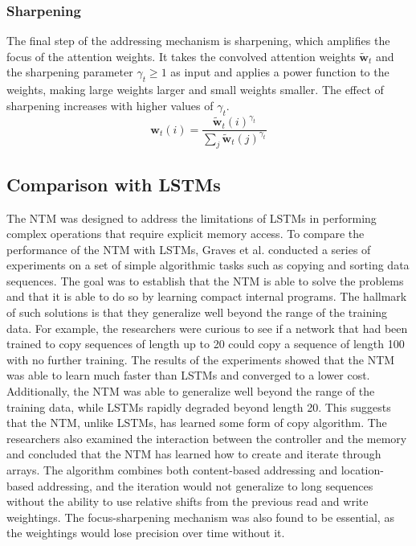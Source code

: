 \documentclass{article}
\begin{document}
\subsubsection{Sharpening}
\label{sec:4.1.3}

The final step of the addressing mechanism is sharpening, which amplifies the focus of the
attention weights. It takes the convolved attention weights $\tilde{\textbf{w}}_t$ and the
sharpening parameter $\gamma_t \geq 1$ as input and applies a power function to the
weights, making large weights larger and small weights smaller. The effect of sharpening
increases with higher values of $\gamma_t$.
\begin{equation}
  \textbf{w}_t(i) = \frac{\tilde{\textbf{w}}_t(i)^{\gamma_t}}{\sum_{j} \tilde{\textbf{w}}_t(j)^{\gamma_t}}
\end{equation}


\subsection{Comparison with LSTMs}
\label{sec:4.2}

The NTM was designed to address the limitations of LSTMs in performing complex operations
that require explicit memory access. To compare the performance of the NTM with LSTMs,
Graves et al. conducted a series of experiments on a set of simple algorithmic tasks such
as copying and sorting data sequences. The goal was to establish that the NTM is able to
solve the problems and that it is able to do so by learning compact internal programs. The
hallmark of such solutions is that they generalize well beyond the range of the training
data. For example, the researchers were curious to see if a network that had been trained
to copy sequences of length up to 20 could copy a sequence of length 100 with no further
training. The results of the experiments showed that the NTM was able to learn much faster
than LSTMs and converged to a lower cost. Additionally, the NTM was able to generalize
well beyond the range of the training data, while LSTMs rapidly degraded beyond length 20.
This suggests that the NTM, unlike LSTMs, has learned some form of copy algorithm. The
researchers also examined the interaction between the controller and the memory and
concluded that the NTM has learned how to create and iterate through arrays. The algorithm
combines both content-based addressing and location-based addressing, and the iteration
would not generalize to long sequences without the ability to use relative shifts from the
previous read and write weightings. The focus-sharpening mechanism was also found to be
essential, as the weightings would lose precision over time without it.
\end{document}
